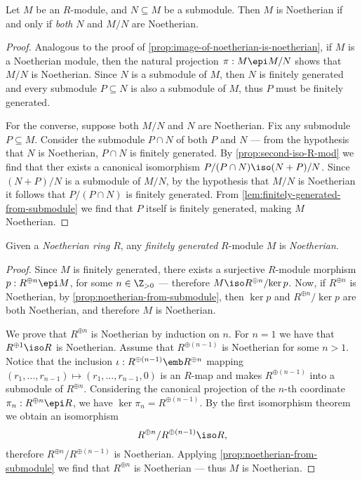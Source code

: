 \begin{proposition}
\label{prop:noetherian-from-submodule}
Let \(M\) be an \(R\)-module, and \(N \subseteq M\) be a submodule. Then \(M\)
is Noetherian if and only if \emph{both} \(N\) and \(M/N\) are Noetherian.
\end{proposition}

\begin{proof}
Analogous to the proof of \cref{prop:image-of-noetherian-is-noetherian}, if
\(M\) is a Noetherian module, then the natural projection \(\pi: M \epi M/N\)
shows that \(M/N\) is Noetherian. Since \(N\) is a submodule of \(M\), then
\(N\) is finitely generated and every submodule \(P \subseteq N\) is also a
submodule of \(M\), thus \(P\) must be finitely generated.

For the converse, suppose both \(M/N\) and \(N\) are Noetherian. Fix any
submodule \(P \subseteq M\). Consider the submodule \(P \cap N\) of both \(P\)
and \(N\) --- from the hypothesis that \(N\) is Noetherian, \(P \cap N\) is
finitely generated. By \cref{prop:second-iso-R-mod} we find that ther exists a
canonical isomorphism \(P/(P \cap N) \iso (N + P)/N\). Since
\((N + P)/N\) is a submodule of \(M/N\), by the hypothesis that \(M/N\) is
Noetherian it follows that \(P/(P \cap N)\) is finitely generated. From
\cref{lem:finitely-generated-from-submodule} we find that \(P\) itself is
finitely generated, making \(M\) Noetherian.
\end{proof}

\begin{corollary}
\label{cor:noetherian-ring-fg-module-is-noetherian}
Given a \emph{Noetherian ring} \(R\), any \emph{finitely generated} \(R\)-module
\(M\) is \emph{Noetherian}.
\end{corollary}

\begin{proof}
Since \(M\) is finitely generated, there exists a surjective \(R\)-module
morphism \(p: R^{\oplus n} \epi M\), for some \(n \in \Z_{> 0}\) --- therefore
\(M \iso R^{\oplus n}/{\ker p}\). Now, if \(R^{\oplus n}\) is Noetherian, by
\cref{prop:noetherian-from-submodule}, then \(\ker p\) and \(R^{\oplus n}/{\ker
  p}\) are both Noetherian, and therefore \(M\) is Noetherian.

We prove that \(R^{\oplus n}\) is Noetherian by induction on \(n\). For
\(n = 1\) we have that \(R^{\oplus 1} \iso R\) is Noetherian. Assume that
\(R^{\oplus(n - 1)}\) is Noetherian for some \(n > 1\). Notice that the
inclusion \(\iota: R^{\oplus (n-1)} \emb R^{\oplus n}\) mapping
\((r_1, \dots, r_{n-1}) \mapsto (r_1, \dots, r_{n-1}, 0)\) is an \(R\)-map and
makes \(R^{\oplus (n-1)}\) into a submodule of \(R^{\oplus n}\). Considering the
canonical projection of the \(n\)-th coordinate \(\pi_n: R^{\oplus n} \epi R\),
we have \(\ker \pi_n = R^{\oplus (n - 1)}\). By the first isomorphism theorem we
obtain an isomorphism
\[
R^{\oplus n}/R^{\oplus (n-1)} \iso R,
\]
therefore \(R^{\oplus n}/R^{\oplus (n-1)}\) is Noetherian. Applying
\cref{prop:noetherian-from-submodule} we find that \(R^{\oplus n}\) is
Noetherian --- thus \(M\) is Noetherian.
\end{proof}

